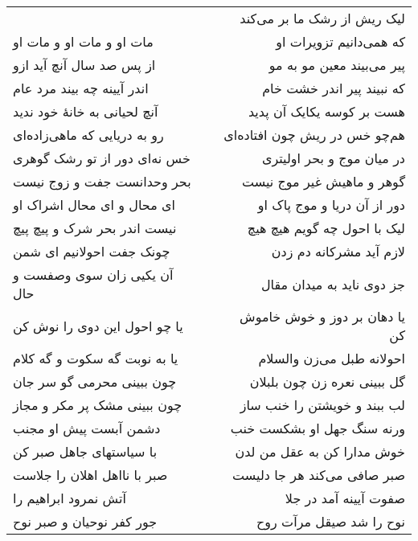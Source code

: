 \begin{center}
\begin{longtable}{l p{0.5cm} r}
&&
لیک ریش از رشک ما بر می‌کند
\\
مات او و مات او و مات او
&&
که همی‌دانیم تزویرات او
\\
از پس صد سال آنچ آید ازو
&&
پیر می‌بیند معین مو به مو
\\
اندر آیینه چه بیند مرد عام
&&
که نبیند پیر اندر خشت خام
\\
آنچ لحیانی به خانهٔ خود ندید
&&
هست بر کوسه یکایک آن پدید
\\
رو به دریایی که ماهی‌زاده‌ای
&&
هم‌چو خس در ریش چون افتاده‌ای
\\
خس نه‌ای دور از تو رشک گوهری
&&
در میان موج و بحر اولیتری
\\
بحر وحدانست جفت و زوج نیست
&&
گوهر و ماهیش غیر موج نیست
\\
ای محال و ای محال اشراک او
&&
دور از آن دریا و موج پاک او
\\
نیست اندر بحر شرک و پیچ پیچ
&&
لیک با احول چه گویم هیچ هیچ
\\
چونک جفت احولانیم ای شمن
&&
لازم آید مشرکانه دم زدن
\\
آن یکیی زان سوی وصفست و حال
&&
جز دوی ناید به میدان مقال
\\
یا چو احول این دوی را نوش کن
&&
یا دهان بر دوز و خوش خاموش کن
\\
یا به نوبت گه سکوت و گه کلام
&&
احولانه طبل می‌زن والسلام
\\
چون ببینی محرمی گو سر جان
&&
گل ببینی نعره زن چون بلبلان
\\
چون ببینی مشک پر مکر و مجاز
&&
لب ببند و خویشتن را خنب ساز
\\
دشمن آبست پیش او مجنب
&&
ورنه سنگ جهل او بشکست خنب
\\
با سیاستهای جاهل صبر کن
&&
خوش مدارا کن به عقل من لدن
\\
صبر با نااهل اهلان را جلاست
&&
صبر صافی می‌کند هر جا دلیست
\\
آتش نمرود ابراهیم را
&&
صفوت آیینه آمد در جلا
\\
جور کفر نوحیان و صبر نوح
&&
نوح را شد صیقل مرآت روح
\\
\end{longtable}
\end{center}
